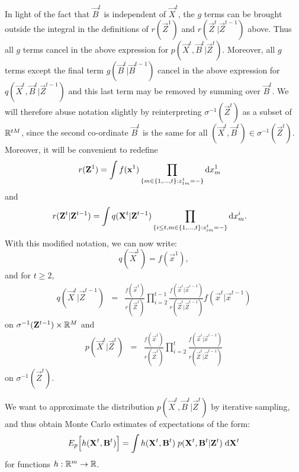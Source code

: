 In light of the fact that $\vec{B}^t$ is independent of $\vec{X}^t$, the $g$ terms can be brought outside the integral in the definitions of $r(\vec{Z}^1)$ and $r(\vec{Z}^t | \vec{Z}^{t-1})$ above. Thus all $g$ terms cancel in the above expression for $p(\vec{X}^t, \vec{B}^t | \vec{Z}^t)$. Moreover, all $g$ terms except the final term $g(\vec{B}^t | \vec{B}^{t-1})$ cancel in the above expression for $q(\vec{X}^t, \vec{B}^t | \vec{Z}^{t-1})$ and this last term may be removed by summing over $\vec{B}^t$. We will therefore abuse notation slightly by reinterpreting $\sigma^{-1}(\vec{Z}^t)$ as a subset of $\mathbb R^{tM}$, since the second co-ordinate $\vec{B}^t$ is the same for all $(\vec{X}^t, \vec{B}^t) \in \sigma^{-1}(\vec{Z}^t)$. Moreover, it will be convenient to redefine
\begin{align*}
    r(\mathbf{Z}^1)  &= \int f(\mathbf{x}^1) \prod_{ \{m \in \{1, \ldots, t \} : z^1_{1m} = - \} } \mathrm{d} x^1_m
\end{align*}
and
\begin{align*}
    r(\mathbf{Z}^t | \mathbf{Z}^{t-1})  &= \int q(\mathbf{X}^t | \mathbf{Z}^{t-1}) \prod_{ \{ i \leq t, m \in \{1, \ldots, t \} : z^t_{im} = - \} } \mathrm{d} x^i_m.
\end{align*}
With this modified notation, we can now write:
\[
q(\vec{X}^1) = f(\vec{x}^1),
\]
and for $t \geq 2$,
\begin{eqnarray*}
    q(\vec{X}^t | \vec{Z}^{t-1}) & = & \frac{f(\vec{x}^1)}{r(\vec{Z}^1)} \prod_{i=2}^{t-1} \frac{f(\vec{x}^i | \vec{x}^{i-1}) }{r(\vec{Z}^t | \vec{Z}^{t-1})} f(\vec{x}^t | \vec{x}^{t-1})
\end{eqnarray*}
on $\sigma^{-1}(\mathbf{Z}^{t-1}) \times \mathbb R^M $ and 
\begin{eqnarray*}
    p(\vec{X}^t | \vec{Z}^t) 
& = & \frac{f(\vec{x}^1)}{r(\vec{Z}^1)} \prod_{i=2}^t \frac{f(\vec{x}^i | \vec{x}^{i-1}) }{r(\vec{Z}^t | \vec{Z}^{t-1})} 
\end{eqnarray*}
on $\sigma^{-1}(\vec{Z}^t)$.







We want to approximate the distribution $p(\vec{X}^{t}, \vec{B}^{t} | \vec{Z}^{t})$ by iterative sampling, and thus obtain Monte Carlo estimates of expectations of the form:
\begin{equation*}
    E_{p} \Big[h(\mathbf{X}^{t}, \mathbf{B}^{t} ) \Big] = \int h(\mathbf{X}^{t}, \mathbf{B}^{t})\; p(\mathbf{X}^{t}, \mathbf{B}^{t} | \mathbf{Z}^{t})\; \mathrm{d} \mathbf{X}^{t}
\end{equation*}
for functions $h: \mathbb R^m  \rightarrow \mathbb R$. 

